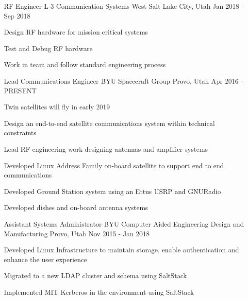 

\begin{cventries}
    \cventry
    {RF Engineer} %
    {L-3 Communication Systems West} %
    {Salt Lake City, Utah} %
    {Jan 2018 - Sep 2018} %
    {
        \begin{cvitems} %
        \item {Design RF hardware for mission critical systems}
        \item {Test and Debug RF hardware}
        \item {Work in team and follow standard engineering process}
        \end{cvitems}
    }

    \cventry
    {Lead Communications Engineer} %
    {BYU Spacecraft Group} %
    {Provo, Utah} %
    {Apr 2016 - PRESENT} %
    {
        \begin{cvitems} %
        \item {Twin satellites will fly in early 2019}
        \item {Design an end-to-end satellite communications system within technical constraints}
        \item {Lead RF engineering work designing antennas and amplifier systems}
        \item {Developed Linux Address Family on-board satellite to support end to end communications}
        \item {Developed Ground Station system using an Ettus USRP and GNURadio}
        \item {Developed dishes and on-board antenna systems}
        \end{cvitems}
    }

    \cventry
    {Assistant Systems Administrator} %
    {BYU Computer Aided Engineering Design and Manufacturing} %
    {Provo, Utah} %
    {Nov 2015 - Jan 2018} %
    {
        \begin{cvitems} %
        \item {Developed Linux Infrastructure to maintain storage, enable authentication and enhance the user experience}
        \item {Migrated to a new LDAP cluster and schema using SaltStack}
        \item {Implemented MIT Kerberos in the environment using SaltStack}
        \end{cvitems}
    }


\end{cventries}
